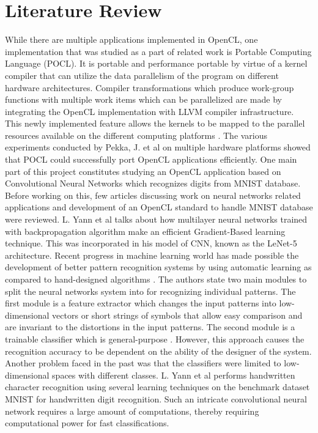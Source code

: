 \chapter{Literature Review}
\label{ch3_lit_review}
While there are multiple applications implemented in OpenCL, one implementation that was studied as a part of related work is Portable Computing Language (POCL). It is portable and performance portable by virtue of a kernel compiler that can utilize the data parallelism of the program on different hardware architectures. Compiler transformations which produce work-group functions with multiple work items which can be parallelized are made by integrating the OpenCL implementation with LLVM compiler infrastructure. This newly implemented feature allows the kernels to be mapped to the parallel resources available on the different computing platforms
\cite{pocl}. The various experiments conducted by Pekka, J. et al on multiple hardware platforms showed that POCL could successfully port OpenCL applications efficiently.\newline\newline
One main part of this project constitutes studying an OpenCL application based on Convolutional Neural Networks which recognizes digits from MNIST database. Before working on this, few articles discussing work on neural networks related applications and development of an OpenCL standard to handle MNIST database were reviewed. L. Yann et al talks about how multilayer neural networks trained with backpropagation algorithm make an efficient Gradient-Based learning technique. This was incorporated in his model of CNN, known as the LeNet-5 architecture. Recent progress in machine learning world has made possible the development of better pattern recognition systems by using automatic learning as compared to hand-designed algorithms
\cite{cnn_yann1998}.\newline\newline
The authors state two main modules to split the neural networks system into for recognizing individual patterns. The first module is a feature extractor which changes the input patterns into low-dimensional vectors or short strings of symbols that allow easy comparison and are invariant to the distortions in the input patterns. The second module is a trainable classifier which is general-purpose 
\cite{cnn_yann1998}. However, this approach causes the recognition accuracy to be dependent on the ability of the designer of the system. Another problem faced in the past was that the classifiers were limited to low-dimensional spaces with different classes. L. Yann et al performs handwritten character recognition using several learning techniques on the benchmark dataset MNIST for handwritten digit recognition. Such an intricate convolutional neural network requires a large amount of computations, thereby requiring computational power for fast classifications.  \newline\newline
